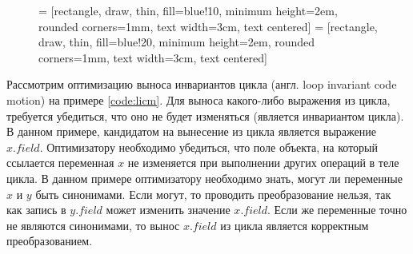 \documentclass[14pt,titlepage]{extarticle}
\newcommand{\eng}[1]{{\English#1}}
\begin{document}
      \begin{figure}[!htb]
        \centering

         = [rectangle, draw, thin, fill=blue!10,
                            minimum height=2em, rounded corners=1mm,
                            text width=3cm, text centered]
         =  [rectangle, draw, thin, fill=blue!20,
                            minimum height=2em, rounded corners=1mm,
                            text width=3cm, text centered]

      \end{figure}

      Рассмотрим оптимизацию выноса инвариантов цикла (англ.
      \eng{loop invariant code motion}) на примере \ref{code:licm}.
      Для выноса какого-либо выражения из цикла, требуется убедиться, что оно
      не будет изменяться (является инвариантом цикла).
      В данном примере, кандидатом на вынесение из цикла является выражение
      $x.field$. Оптимизатору необходимо убедиться, что поле объекта, на
      который ссылается переменная $x$ не изменяется при выполнении других
      операций в теле цикла. В данном примере оптимизатору необходимо знать,
      могут ли переменные $x$ и $y$ быть синонимами. Если могут, то
      проводить преобразование нельзя, так как запись в $y.field$ может
      изменить значение $x.field$. Если же переменные точно не являются
      синонимами, то вынос $x.field$ из цикла является корректным
      преобразованием.
\end{document}
